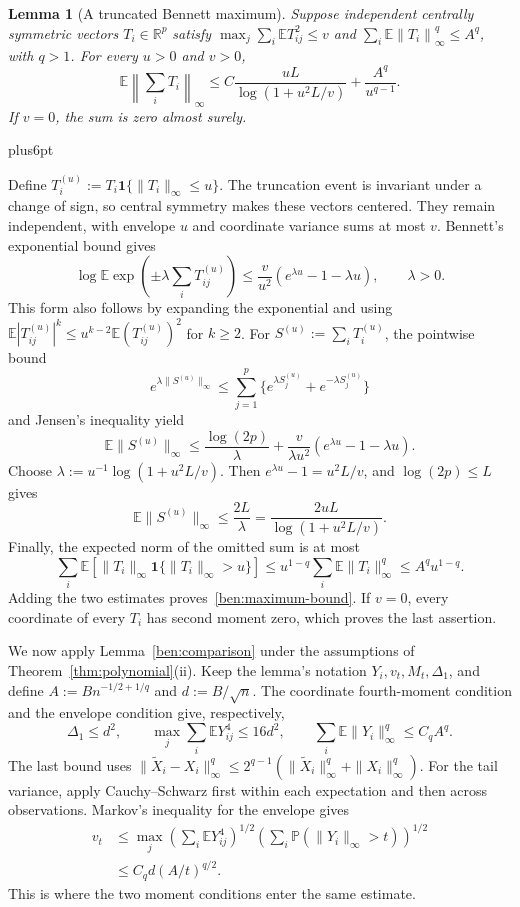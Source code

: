 \documentclass[11pt,letterpaper,twoside,leqno]{article}
\makeatletter
\theoremstyle{bookplain}
\newtheorem{lemma}{Lemma}
\theoremstyle{bookremark}
\renewenvironment{proof}[1][\proofname]{\par
  \pushQED{\qed}\normalfont\topsep6pt plus6pt\relax
  \trivlist\item[\hskip\labelsep\bfseries #1\@addpunct{.}]\ignorespaces
}{\popQED\endtrivlist\@endpefalse}
\newcommand{\E}{\mathbb E}
\newcommand{\Pp}{\mathbb P}
\newcommand{\R}{\mathbb R}
\newcommand{\norm}[1]{\left\lVert#1\right\rVert}
\newcommand{\ind}{\mathbf 1}
\makeatother
\begin{document}
\begin{lemma}[A truncated Bennett maximum]\label{ben:maximum}
Suppose independent centrally symmetric vectors $T_i\in\R^p$
satisfy $\max_j\sum_i\E T_{ij}^2\le v$ and
$\sum_i\E\norm{T_i}_\infty^q\le A^q$, with $q>1$.
For every $u>0$ and $v>0$,
\begin{equation}
 \E\norm{\sum_iT_i}_\infty
 \le C\frac{uL}{\log(1+u^2L/v)}+\frac{A^q}{u^{q-1}}.
 \label{ben:maximum-bound}
\end{equation}
If $v=0$, the sum is zero almost surely.
\end{lemma}
\begin{proof}
Define $T_i^{(u)}:=T_i\ind\{\|T_i\|_\infty\le u\}$.
The truncation event is invariant under a change of sign, so
central symmetry makes these vectors centered. They remain
independent, with envelope $u$ and coordinate variance sums at
most $v$. Bennett's exponential bound
\cite[Theorem~2.9]{BLM2013} gives
\[
 \log\E\exp\left(\pm\lambda\sum_iT_{ij}^{(u)}\right)
 \le\frac v{u^2}(e^{\lambda u}-1-\lambda u),\qquad\lambda>0.
\]
This form also follows by expanding the exponential and using
$\E|T_{ij}^{(u)}|^k\le u^{k-2}\E(T_{ij}^{(u)})^2$ for
$k\ge2$. For $S^{(u)}:=\sum_iT_i^{(u)}$, the pointwise bound
\[
 e^{\lambda\|S^{(u)}\|_\infty}
 \le\sum_{j=1}^p\{e^{\lambda S_j^{(u)}}+e^{-\lambda S_j^{(u)}}\}
\]
and Jensen's inequality yield
\[
 \E\|S^{(u)}\|_\infty
 \le\frac{\log(2p)}\lambda
      +\frac v{\lambda u^2}(e^{\lambda u}-1-\lambda u).
\]
Choose $\lambda:=u^{-1}\log(1+u^2L/v)$. Then
$e^{\lambda u}-1=u^2L/v$, and $\log(2p)\le L$ gives
\[
 \E\|S^{(u)}\|_\infty
 \le\frac{2L}{\lambda}
 =\frac{2uL}{\log(1+u^2L/v)}.
\]
Finally, the expected norm of the omitted sum is at most
\[
 \sum_i\E[\|T_i\|_\infty\ind\{\|T_i\|_\infty>u\}]
 \le u^{1-q}\sum_i\E\|T_i\|_\infty^q
 \le A^qu^{1-q}.
\]
Adding the two estimates proves~\eqref{ben:maximum-bound}.
If $v=0$, every coordinate of every $T_i$ has second moment
zero, which proves the last assertion.
\end{proof}

We now apply Lemma~\ref{ben:comparison} under the assumptions of
Theorem~\ref{thm:polynomial}\textup{(ii)}. Keep the lemma's
notation $Y_i,v_t,M_t,\Delta_1$, and define
$A:=Bn^{-1/2+1/q}$ and $d:=B/\sqrt n$. The coordinate
fourth-moment condition and the envelope condition give, respectively,
\[
 \Delta_1\le d^2,\qquad
 \max_j\sum_i\E Y_{ij}^4\le16d^2,\qquad
 \sum_i\E\|Y_i\|_\infty^q\le C_qA^q.
\]
The last bound uses
$\|\widetilde X_i-X_i\|_\infty^q
\le2^{q-1}(\|\widetilde X_i\|_\infty^q+\|X_i\|_\infty^q)$.
For the tail variance, apply Cauchy--Schwarz first within each
expectation and then across observations. Markov's inequality
for the envelope gives
\begin{equation}
 \begin{split}
 v_t&\le
 \max_j\left(\sum_i\E Y_{ij}^4\right)^{1/2}
       \left(\sum_i\Pp(\|Y_i\|_\infty>t)\right)^{1/2}\\
 &\le C_qd(A/t)^{q/2}.
 \end{split}
 \label{ben:mixed}
\end{equation}
This is where the two moment conditions enter the same estimate.
\end{document}
